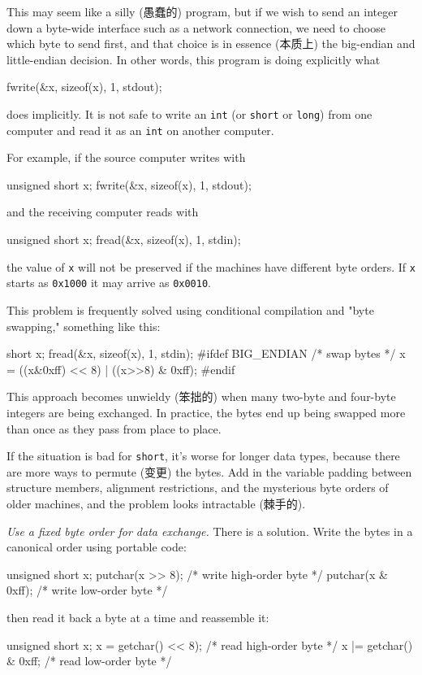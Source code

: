 This may seem like a silly (愚蠢的) program, but if we wish to send an
integer down a byte-wide interface such as a network connection, we need to
choose which byte to send first, and that choice is in essence (本质上) the
big-endian and little-endian decision. In other words, this program is
doing explicitly what
\begin{wellcode}
    fwrite(&x, sizeof(x), 1, stdout);
\end{wellcode}
does implicitly. It is not safe to write an \verb'int' (or \verb'short' or
\verb'long') from one computer and read it as an \verb'int' on another
computer.

For example, if the source computer writes with
\begin{wellcode}
    unsigned short x;
    fwrite(&x, sizeof(x), 1, stdout);
\end{wellcode}
and the receiving computer reads with
\begin{wellcode}
    unsigned short x;
    fread(&x, sizeof(x), 1, stdin);
\end{wellcode}
the value of \verb'x' will not be preserved if the machines have different
byte orders. If \verb'x' starts as \verb'0x1000' it may arrive as
\verb'0x0010'.

This problem is frequently solved using conditional compilation and "byte
swapping,"  something like this:
\begin{badcode}
    short x;
    fread(&x, sizeof(x), 1, stdin);
    #ifdef BIG_ENDIAN
    /* swap bytes */
    x = ((x&0xff) << 8) | ((x>>8) & 0xff);
    #endif
\end{badcode}
This approach becomes unwieldy (笨拙的) when many two-byte and four-byte
integers are being exchanged. In practice, the bytes end up being swapped
more than once as they pass from place to place.

If the situation is bad for \verb'short', it's worse for longer data types,
because there are more ways to permute (变更) the bytes. Add in the
variable padding between structure members, alignment restrictions, and the
mysterious byte orders of older machines, and the problem looks intractable
(棘手的).

\emph{Use a fixed byte order for data exchange.} There is a solution. Write
the bytes in a canonical order using portable code:
\begin{wellcode}
    unsigned short x;
    putchar(x >> 8);    /* write high-order byte */
    putchar(x & 0xff);  /* write low-order byte */
\end{wellcode}
then read it back a byte at a time and reassemble it:
\begin{wellcode}
    unsigned short x;
    x = getchar() << 8);    /* read high-order byte */
    x |= getchar() & 0xff;  /* read low-order byte */
\end{wellcode}

